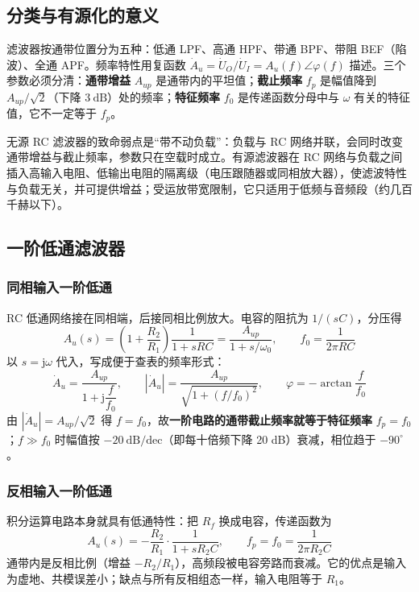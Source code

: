\subsection{分类与有源化的意义}
滤波器按通带位置分为五种：低通 LPF、高通 HPF、带通 BPF、带阻 BEF（陷波）、全通 APF。频率特性用复函数 $\dot A_u=\dot U_O/\dot U_I=A_u(f)\angle\varphi(f)$ 描述。三个参数必须分清：\textbf{通带增益} $A_{up}$ 是通带内的平坦值；\textbf{截止频率} $f_p$ 是幅值降到 $A_{up}/\sqrt2$（下降 $3\ \mathrm{dB}$）处的频率；\textbf{特征频率} $f_0$ 是传递函数分母中与 $\omega$ 有关的特征值，它不一定等于 $f_p$。

无源 RC 滤波器的致命弱点是“带不动负载”：负载与 RC 网络并联，会同时改变通带增益与截止频率，参数只在空载时成立。有源滤波器在 RC 网络与负载之间插入高输入电阻、低输出电阻的隔离级（电压跟随器或同相放大器），使滤波特性与负载无关，并可提供增益；受运放带宽限制，它只适用于低频与音频段（约几百千赫以下）。

\subsection{一阶低通滤波器}
\subsubsection{同相输入一阶低通}
RC 低通网络接在同相端，后接同相比例放大。电容的阻抗为 $1/(sC)$，分压得
\begin{equation}
A_u(s) = \left(1+\frac{R_2}{R_1}\right)\frac{1}{1+sRC}
=\frac{A_{up}}{1+s/\omega_0},\qquad f_0=\frac{1}{2\pi RC}
\end{equation}
以 $s=\mathrm{j}\omega$ 代入，写成便于查表的频率形式：
\begin{equation}
\dot A_u = \frac{A_{up}}{1+\mathrm{j}\dfrac{f}{f_0}},\qquad
|\dot A_u| = \frac{A_{up}}{\sqrt{1+(f/f_0)^2}},\qquad
\varphi = -\arctan\frac{f}{f_0}
\end{equation}
由 $|\dot A_u|=A_{up}/\sqrt{2}$ 得 $f=f_0$，故\textbf{一阶电路的通带截止频率就等于特征频率} $f_p=f_0$；$f\gg f_0$ 时幅值按 $-20\ \mathrm{dB/dec}$（即每十倍频下降 20 dB）衰减，相位趋于 $-90^\circ$。

\subsubsection{反相输入一阶低通}
积分运算电路本身就具有低通特性：把 $R_f$ 换成电容，传递函数为
\begin{equation}
A_u(s) = -\frac{R_2}{R_1}\cdot\frac{1}{1+sR_2C},\qquad f_p=f_0=\frac{1}{2\pi R_2C}
\end{equation}
通带内是反相比例（增益 $-R_2/R_1$），高频段被电容旁路而衰减。它的优点是输入为虚地、共模误差小；缺点与所有反相组态一样，输入电阻等于 $R_1$。

